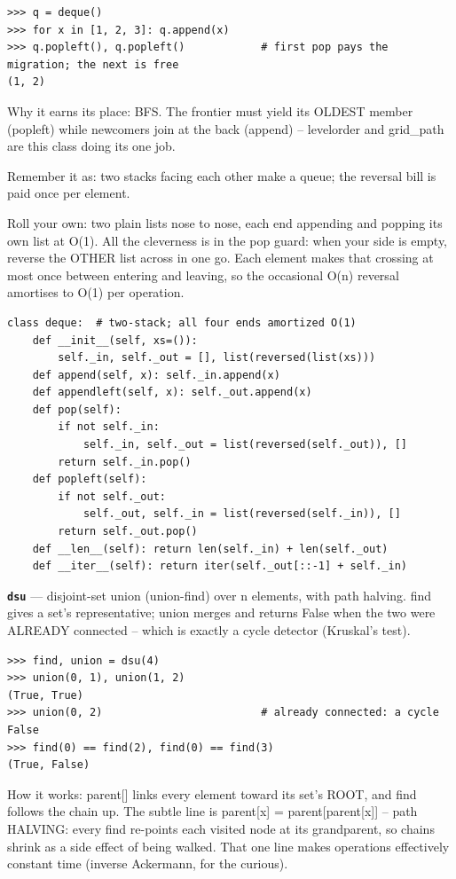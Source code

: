 \documentclass[10pt,letterpaper]{article}
\begin{document}
\begin{lstlisting}[style=ex]
>>> q = deque()
>>> for x in [1, 2, 3]: q.append(x)
>>> q.popleft(), q.popleft()            # first pop pays the migration; the next is free
(1, 2)
\end{lstlisting}

Why it earns its place: BFS. The frontier must yield its OLDEST member (popleft) while newcomers join at the back (append) -- levelorder and grid\_path are this class doing its one job.


Remember it as: two stacks facing each other make a queue; the reversal bill is paid once per element.


Roll your own: two plain lists nose to nose, each end appending and popping its own list at O(1). All the cleverness is in the pop guard: when your side is empty, reverse the OTHER list across in one go. Each element makes that crossing at most once between entering and leaving, so the occasional O(n) reversal amortises to O(1) per operation.

\begin{lstlisting}[style=ex]
class deque:  # two-stack; all four ends amortized O(1)
    def __init__(self, xs=()):
        self._in, self._out = [], list(reversed(list(xs)))
    def append(self, x): self._in.append(x)
    def appendleft(self, x): self._out.append(x)
    def pop(self):
        if not self._in:
            self._in, self._out = list(reversed(self._out)), []
        return self._in.pop()
    def popleft(self):
        if not self._out:
            self._out, self._in = list(reversed(self._in)), []
        return self._out.pop()
    def __len__(self): return len(self._in) + len(self._out)
    def __iter__(self): return iter(self._out[::-1] + self._in)
\end{lstlisting}
\textbf{\texttt{dsu}} --- disjoint-set union (union-find) over n elements, with path halving. find gives a set's representative; union merges and returns False when the two were ALREADY connected -- which is exactly a cycle detector (Kruskal's test).
\begin{lstlisting}[style=ex]
>>> find, union = dsu(4)
>>> union(0, 1), union(1, 2)
(True, True)
>>> union(0, 2)                         # already connected: a cycle
False
>>> find(0) == find(2), find(0) == find(3)
(True, False)
\end{lstlisting}

How it works: parent[] links every element toward its set's ROOT, and find follows the chain up. The subtle line is parent[x] = parent[parent[x]] -- path HALVING: every find re-points each visited node at its grandparent, so chains shrink as a side effect of being walked. That one line makes operations effectively constant time (inverse Ackermann, for the curious).
\end{document}
